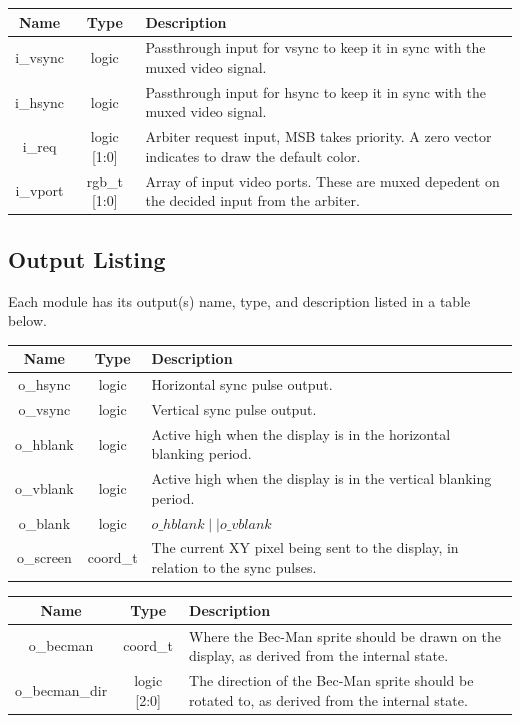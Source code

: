 \documentclass[12pt]{article}
\begin{document}
\vspace{0.5in}
\begingroup
{}
\label{tab:input_map_ram}
\begin{tabularx}{\linewidth}{ ||c|c|X|| }
    \hline
    Name & Type & Description \\
    \hline
    i\_vsync & logic & Passthrough input for vsync to keep it in sync with the
    muxed video signal. \\
    i\_hsync & logic & Passthrough input for hsync to keep it in sync with the
    muxed video signal. \\
    i\_req & logic [1:0] & Arbiter request input, MSB takes priority. A zero
    vector indicates to draw the default color. \\
    i\_vport & rgb\_t [1:0] & Array of input video ports. These are muxed
    depedent on the decided input from the arbiter. \\
    \hline
\end{tabularx}
\endgroup

%
%
\subsection{Output Listing}
Each module has its output(s) name, type, and description listed in a table
below.

\begingroup
{}
\label{tab:output_vtg}
\begin{tabularx}{\linewidth}{ ||c|c|X|| }
    \hline
    Name & Type & Description \\
    \hline
    o\_hsync & logic & Horizontal sync pulse output. \\
    o\_vsync & logic & Vertical sync pulse output. \\
    o\_hblank & logic & Active high when the display is in the horizontal blanking
    period. \\
    o\_vblank & logic & Active high when the display is in the vertical blanking
    period. \\
    o\_blank & logic & $o\_hblank \mid \mid o\_vblank$ \\
    o\_screen & coord\_t & The current XY pixel being sent to the display, in
    relation to the sync pulses. \\
    \hline
\end{tabularx}
\endgroup

\vspace{0.5in}
\begingroup
{}
\label{tab:output_game_state}
\begin{tabularx}{\linewidth}{ ||c|c|X|| }
    \hline
    Name & Type & Description \\
    \hline
    o\_becman & coord\_t & Where the Bec-Man sprite should be drawn on the
    display, as derived from the internal state. \\
    o\_becman\_dir & logic [2:0] & The direction of the Bec-Man sprite should be
    rotated to, as derived from the internal state. \\
    \hline
\end{tabularx}
\endgroup
\end{document}
